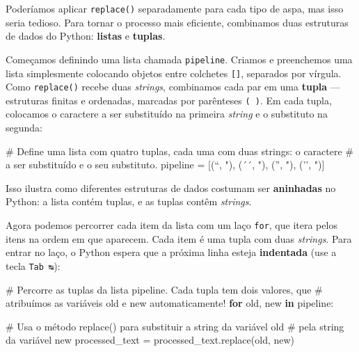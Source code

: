 \documentclass[
  brazilian,
  11pt,
]{article}
\newenvironment{Shaded}{\begin{snugshade}}{\end{snugshade}}
\newcommand{\CommentTok}[1]{\textcolor[rgb]{0.48,0.49,0.49}{#1}}
\newcommand{\ControlFlowTok}[1]{\textcolor[rgb]{0.99,0.74,0.29}{\textbf{#1}}}
\newcommand{\KeywordTok}[1]{\textcolor[rgb]{0.81,0.81,0.76}{\textbf{#1}}}
\newcommand{\NormalTok}[1]{\textcolor[rgb]{0.81,0.81,0.76}{#1}}
\newcommand{\OperatorTok}[1]{\textcolor[rgb]{0.81,0.81,0.76}{#1}}
\newcommand{\StringTok}[1]{\textcolor[rgb]{0.96,0.31,0.31}{#1}}
\let\oldtexttt\texttt
\renewcommand{\texttt}[1]{{\color{inlink}\oldtexttt{#1}}}
\begin{document}
Poderíamos aplicar \texttt{replace()} separadamente para cada tipo de
aspa, mas isso seria tedioso. Para tornar o processo mais eficiente,
combinamos duas estruturas de dados do Python: \textbf{listas} e
\textbf{tuplas}.

Começamos definindo uma lista chamada \texttt{pipeline}. Criamos e
preenchemos uma lista simplesmente colocando objetos entre colchetes
\texttt{{[}{]}}, separados por vírgula. Como \texttt{replace()} recebe
duas \emph{strings}, combinamos cada par em uma \textbf{tupla} ---
estruturas finitas e ordenadas, marcadas por parênteses \texttt{(\ )}.
Em cada tupla, colocamos o caractere a ser substituído na primeira
\emph{string} e o substituto na segunda:

\begin{Shaded}
\begin{Highlighting}[]
\CommentTok{\# Define uma lista com quatro tuplas, cada uma com duas strings: o caractere}
\CommentTok{\# a ser substituído e o seu substituto.}
\NormalTok{pipeline }\OperatorTok{=}\NormalTok{ [(}\StringTok{\textquotesingle{}“\textquotesingle{}}\NormalTok{, }\StringTok{\textquotesingle{}"\textquotesingle{}}\NormalTok{), (}\StringTok{\textquotesingle{}´´\textquotesingle{}}\NormalTok{, }\StringTok{\textquotesingle{}"\textquotesingle{}}\NormalTok{), (}\StringTok{\textquotesingle{}”\textquotesingle{}}\NormalTok{, }\StringTok{\textquotesingle{}"\textquotesingle{}}\NormalTok{), (}\StringTok{\textquotesingle{}’’\textquotesingle{}}\NormalTok{, }\StringTok{\textquotesingle{}"\textquotesingle{}}\NormalTok{)]}
\end{Highlighting}
\end{Shaded}

Isso ilustra como diferentes estruturas de dados costumam ser
\textbf{aninhadas} no Python: a lista contém tuplas, e as tuplas contêm
\emph{strings}.

Agora podemos percorrer cada item da lista com um laço \texttt{for}, que
itera pelos itens na ordem em que aparecem. Cada item é uma tupla com
duas \emph{strings}. Para entrar no laço, o Python espera que a próxima
linha esteja \textbf{indentada} (use a tecla \texttt{Tab\ ↹}):

\begin{Shaded}
\begin{Highlighting}[]
\CommentTok{\# Percorre as tuplas da lista \textquotesingle{}pipeline\textquotesingle{}. Cada tupla tem dois valores, que}
\CommentTok{\# atribuímos as variáveis \textquotesingle{}old\textquotesingle{} e \textquotesingle{}new\textquotesingle{} automaticamente!}
\ControlFlowTok{for}\NormalTok{ old, new }\KeywordTok{in}\NormalTok{ pipeline:}

    \CommentTok{\# Usa o método replace() para substituir a string da variável \textquotesingle{}old\textquotesingle{}}
    \CommentTok{\# pela string da variável \textquotesingle{}new\textquotesingle{}}
\NormalTok{    processed\_text }\OperatorTok{=}\NormalTok{ processed\_text.replace(old, new)}
\end{Highlighting}
\end{Shaded}
\end{document}
